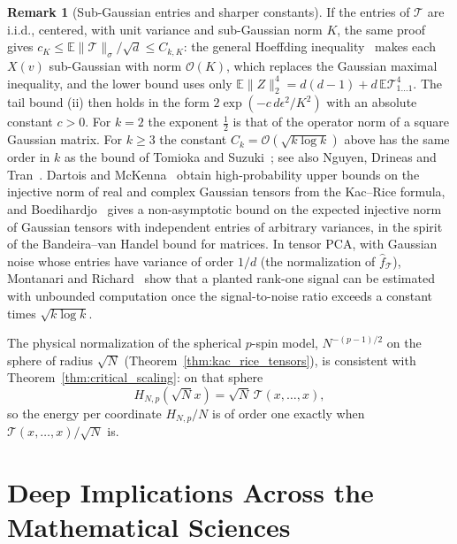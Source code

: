\documentclass[11pt,a4paper,reqno]{amsart}
\theoremstyle{definition}
\newtheorem{remark}[theorem]{Remark}
\numberwithin{equation}{section}
\begin{document}
\begin{remark}[Sub-Gaussian entries and sharper constants]
\label{rem:subgaussian}
If the entries of $\mathcal{T}$ are i.i.d., centered, with unit variance and sub-Gaussian norm $K$, the same proof gives $c_K \le \mathbb{E}\|\mathcal{T}\|_\sigma / \sqrt{d} \le C_{k,K}$: the general Hoeffding inequality~\cite[\S2.6]{vershynin2018high} makes each $X(v)$ sub-Gaussian with norm $\mathcal{O}(K)$, which replaces the Gaussian maximal inequality, and the lower bound uses only $\mathbb{E}\|Z\|_2^4 = d(d - 1) + d\,\mathbb{E}\mathcal{T}_{1\dots1}^4$. The tail bound (ii) then holds in the form $2\exp(-c\, d\epsilon^2 / K^2)$ with an absolute constant $c > 0$. For $k = 2$ the exponent $\frac12$ is that of the operator norm of a square Gaussian matrix. For $k \ge 3$ the constant $C_k = \mathcal{O}(\sqrt{k \log k})$ above has the same order in $k$ as the bound of Tomioka and Suzuki~\cite{tomioka2014spectral}; see also Nguyen, Drineas and Tran~\cite{nguyen2015tensor}. Dartois and McKenna~\cite{dartois2024injective} obtain high-probability upper bounds on the injective norm of real and complex Gaussian tensors from the Kac--Rice formula, and Boedihardjo~\cite{boedihardjo2024injective} gives a non-asymptotic bound on the expected injective norm of Gaussian tensors with independent entries of arbitrary variances, in the spirit of the Bandeira--van Handel bound for matrices. In tensor PCA, with Gaussian noise whose entries have variance of order $1/d$ (the normalization of $\widehat{f}_{\mathcal{T}}$), Montanari and Richard~\cite{montanari2014statistical} show that a planted rank-one signal can be estimated with unbounded computation once the signal-to-noise ratio exceeds a constant times $\sqrt{k \log k}$.
\end{remark}

The physical normalization of the spherical $p$-spin model, $N^{-(p-1)/2}$ on the sphere of radius $\sqrt{N}$ (Theorem~\ref{thm:kac_rice_tensors}), is consistent with Theorem~\ref{thm:critical_scaling}: on that sphere
\[
H_{N,p}(\sqrt{N}x) = \sqrt{N}\,\mathcal{T}(x,\dots,x),
\]
so the energy per coordinate $H_{N,p}/N$ is of order one exactly when $\mathcal{T}(x, \dots, x)/\sqrt{N}$ is.


\section{Deep Implications Across the Mathematical Sciences}
\label{sec:implications}
\end{document}
